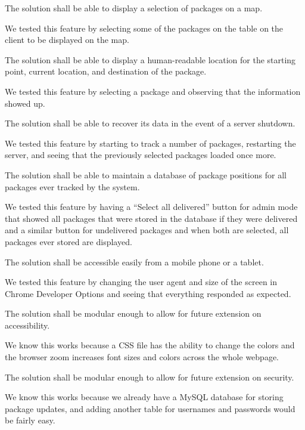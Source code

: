 \begin{DoxyEnumerate}
\item The solution shall be able to display a selection of packages on a map.
\begin{DoxyItemize}
\item We tested this feature by selecting some of the packages on the table on the client to be displayed on the map.
\end{DoxyItemize}
\item The solution shall be able to display a human-\/readable location for the starting point, current location, and destination of the package.
\begin{DoxyItemize}
\item We tested this feature by selecting a package and observing that the information showed up.
\end{DoxyItemize}
\item The solution shall be able to recover its data in the event of a server shutdown.
\begin{DoxyItemize}
\item We tested this feature by starting to track a number of packages, restarting the server, and seeing that the previously selected packages loaded once more.
\end{DoxyItemize}
\item The solution shall be able to maintain a database of package positions for all packages ever tracked by the system.
\begin{DoxyItemize}
\item We tested this feature by having a “\+Select all delivered” button for admin mode that showed all packages that were stored in the database if they were delivered and a similar button for undelivered packages and when both are selected, all packages ever stored are displayed.
\end{DoxyItemize}
\item The solution shall be accessible easily from a mobile phone or a tablet.
\begin{DoxyItemize}
\item We tested this feature by changing the user agent and size of the screen in Chrome Developer Options and seeing that everything responded as expected.
\end{DoxyItemize}
\item The solution shall be modular enough to allow for future extension on accessibility.
\begin{DoxyItemize}
\item We know this works because a C\+SS file has the ability to change the colors and the browser zoom increases font sizes and colors across the whole webpage.
\end{DoxyItemize}
\item The solution shall be modular enough to allow for future extension on security.
\begin{DoxyItemize}
\item We know this works because we already have a My\+S\+QL database for storing package updates, and adding another table for usernames and passwords would be fairly easy. 
\end{DoxyItemize}
\end{DoxyEnumerate}
